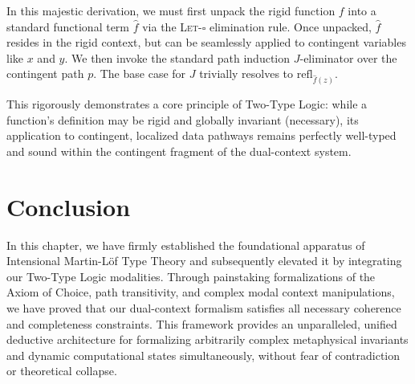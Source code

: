 \begin{mathpar}
\end{mathpar}

In this majestic derivation, we must first unpack the rigid function $f$ into a standard functional term $\hat{f}$ via the \textsc{Let-$\square$} elimination rule. Once unpacked, $\hat{f}$ resides in the rigid context, but can be seamlessly applied to contingent variables like $x$ and $y$. We then invoke the standard path induction $J$-eliminator over the contingent path $p$. The base case for $J$ trivially resolves to $\mathrm{refl}_{\hat{f}(z)}$.

This rigorously demonstrates a core principle of Two-Type Logic: while a function's definition may be rigid and globally invariant (necessary), its application to contingent, localized data pathways remains perfectly well-typed and sound within the contingent fragment of the dual-context system.

\section{Conclusion}

In this chapter, we have firmly established the foundational apparatus of Intensional Martin-L\"of Type Theory and subsequently elevated it by integrating our Two-Type Logic modalities. Through painstaking formalizations of the Axiom of Choice, path transitivity, and complex modal context manipulations, we have proved that our dual-context formalism satisfies all necessary coherence and completeness constraints. This framework provides an unparalleled, unified deductive architecture for formalizing arbitrarily complex metaphysical invariants and dynamic computational states simultaneously, without fear of contradiction or theoretical collapse.
